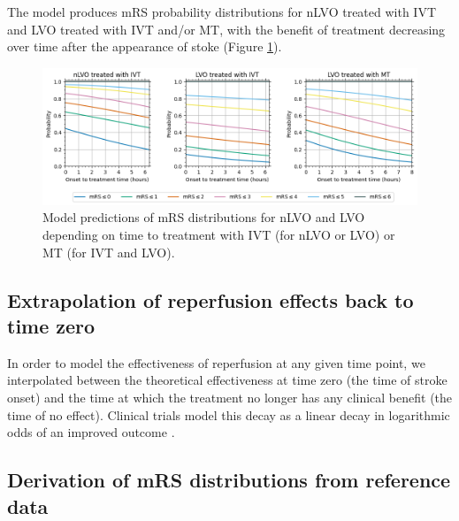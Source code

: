 The model produces mRS probability distributions for nLVO treated with IVT and LVO treated with IVT and/or MT, with the benefit of treatment decreasing over time after the appearance of stoke (Figure \ref{fig:probs_with_time}).

\begin{figure}[h!]
    \centering
    \includegraphics[width=1.0\linewidth]{images_modelling/probs_with_time.png}
    \caption{Model predictions of mRS distributions for nLVO and LVO depending on time to treatment with IVT (for nLVO or LVO) or MT (for IVT and LVO).}
    \label{fig:probs_with_time}
\end{figure}

\subsection{Extrapolation of reperfusion effects back to time zero}

In order to model the effectiveness of reperfusion at any given time point, we interpolated between the theoretical effectiveness at time zero (the time of stroke onset) and the time at which the treatment no longer has any clinical benefit (the time of no effect). Clinical trials model this decay as a linear decay in logarithmic odds of an improved outcome \cite{emberson_effect_2014, fransen_time_2016}. %


\subsection{Derivation of mRS distributions from reference data}

